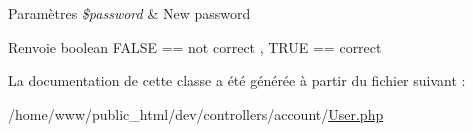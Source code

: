 \begin{DoxyParams}{Paramètres}
{\em \$password} & New password \\
\hline
\end{DoxyParams}
\begin{DoxyReturn}{Renvoie}
boolean F\-A\-L\-S\-E == not correct , T\-R\-U\-E == correct 
\end{DoxyReturn}


La documentation de cette classe a été générée à partir du fichier suivant \-:\begin{DoxyCompactItemize}
\item 
/home/www/public\-\_\-html/dev/controllers/account/\hyperlink{_user_8php}{User.\-php}\end{DoxyCompactItemize}
